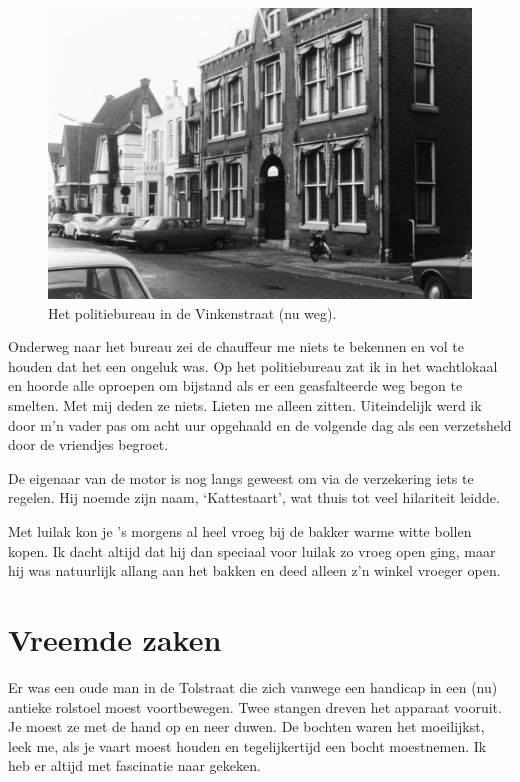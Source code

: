 \documentclass[12pt,twoside, openright]{memoir}
\begin{document}
\begin{figure}
\includegraphics[width=\textwidth]{img/ch9/politburo}
\caption*{\footnotesize Het politiebureau in de Vinkenstraat (nu weg).}
\end{figure}

Onderweg naar het bureau zei de chauffeur me niets te bekennen en vol te houden dat het een ongeluk was. Op het politiebureau zat ik in het wachtlokaal en hoorde alle oproepen om bijstand als er een geasfalteerde weg begon te smelten. Met mij deden ze niets. Lieten me alleen zitten. Uiteindelijk werd ik door m’n vader pas om acht uur opgehaald en de volgende dag als een verzetsheld door de vriendjes begroet. 

De eigenaar van de motor is nog langs geweest om via de verzekering iets te regelen. Hij noemde zijn naam, `Kattestaart', wat thuis tot veel hilariteit leidde.

Met luilak kon je ’s morgens al heel vroeg bij de bakker warme witte bollen kopen. Ik dacht altijd dat hij dan speciaal voor luilak zo vroeg open ging, maar hij was natuurlijk allang aan het bakken en deed alleen z’n winkel vroeger open. 

\chapter{Vreemde zaken} %
\label{cha:vreemde_zaken}

Er was een oude man in de Tolstraat die zich vanwege een handicap in een (nu) antieke rolstoel moest voortbewegen. Twee stangen dreven het apparaat vooruit. Je moest ze met de hand op en neer duwen. De bochten waren het moeilijkst, leek me, als je vaart moest houden en tegelijkertijd een bocht moestnemen. Ik heb er altijd met fascinatie naar gekeken. 
\end{document}
